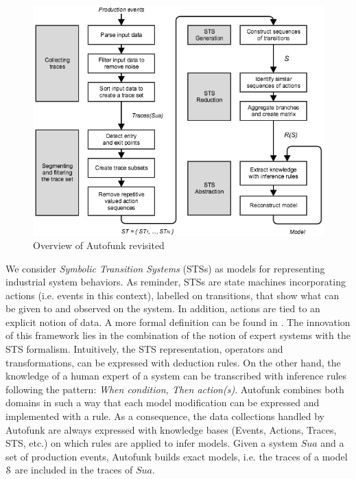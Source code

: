 \begin{figure}[ht]
\includegraphics[width=1.0\linewidth]{figures/autofunk.png}

\caption{Overview of Autofunk revisited}
\label{fig:prodsystems:autofunk-overview}
\end{figure}

We consider \textit{Symbolic Transition Systems} (STSs) as models
for representing industrial system behaviors. As reminder, STSs
are state machines incorporating actions (i.e. events in this
context), labelled on transitions, that show what can be given to
and observed on the system. In addition, actions are tied to an
explicit notion of data. A more formal definition can be found
in .
The innovation of this framework lies in
the combination of the notion of expert systems with the STS
formalism. Intuitively, the STS representation, operators and
transformations, can be expressed with deduction rules. On the
other hand, the knowledge of a human expert of a system can be
transcribed with inference rules following the pattern:
\textit{When condition, Then action(s)}. Autofunk combines both
domains in such a way that each model modification can be
expressed and implemented with a rule. As a consequence, the data
collections handled by Autofunk are always expressed with
knowledge bases (Events, Actions, Traces, STS, etc.) on which
rules are applied to infer models. Given a system $\mathit{Sua}$ and a set
of production events, Autofunk builds exact models, i.e. the
traces of a model $\EuScript{S}$ are included in the traces of
$\mathit{Sua}$.

